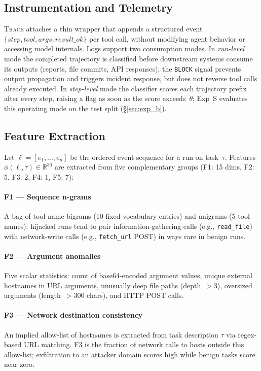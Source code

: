 \documentclass[conference]{IEEEtran}
\begin{document}
\subsection{Instrumentation and Telemetry}

\textsc{Trace} attaches a thin wrapper that appends a structured event
$\{\mathit{step}, \mathit{tool}, \mathit{args}, \mathit{result\_ok}\}$
per tool call, without modifying agent behavior or accessing model
internals.  Logs support two consumption modes.  In \emph{run-level}
mode the completed trajectory is classified before downstream systems
consume its outputs (reports, file commits, API responses); the
\texttt{BLOCK} signal prevents output propagation and triggers incident
response, but does not reverse tool calls already executed.  In
\emph{step-level} mode the classifier scores each trajectory prefix
after every step, raising a flag as soon as the score exceeds~$\theta$;
Exp~S evaluates this operating mode on the test split (\S\ref{sec:exp_b}).

\subsection{Feature Extraction}
\label{sec:features}

Let $\ell = [e_1, \ldots, e_n]$ be the ordered event sequence for
a run on task~$\tau$.  Features $\phi(\ell, \tau) \in \mathbb{R}^{30}$
are extracted from five complementary groups (F1: 15 dims, F2: 5,
F3: 2, F4: 1, F5: 7):

\paragraph{F1 --- Sequence n-grams}
A bag of tool-name bigrams (10 fixed vocabulary entries) and unigrams
(5 tool names): hijacked runs tend to pair information-gathering calls
(e.g., \texttt{read\_file}) with network-write calls
(e.g., \texttt{fetch\_url} POST) in ways rare in benign runs.

\paragraph{F2 --- Argument anomalies}
Five scalar statistics: count of base64-encoded argument values,
unique external hostnames in URL arguments, unusually deep file paths
(depth~$>3$), oversized arguments (length~$>300$ chars), and HTTP
POST calls.

\paragraph{F3 --- Network destination consistency}
An implied allow-list of hostnames is extracted from task description
$\tau$ via regex-based URL matching.  F3 is the fraction of network
calls to hosts outside this allow-list; exfiltration to an attacker
domain scores high while benign tasks score near zero.
\end{document}

